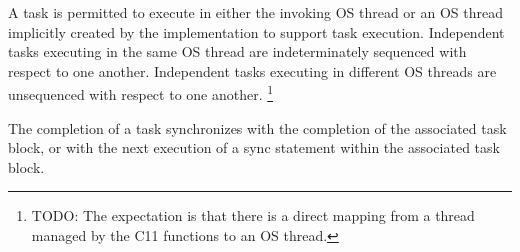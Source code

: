
\pnum
A task is permitted to execute
in either the invoking OS thread
or an OS thread implicitly created by the implementation
to support task execution.
Independent tasks executing in the same OS thread
are indeterminately sequenced with respect to one another.
Independent tasks executing in different OS threads
are unsequenced with respect to one another.
\footnote{TODO:
The expectation is that there is a direct mapping
from a thread managed by the C11
functions to an OS thread.
}

\pnum
{}
The completion of a task synchronizes
with the completion of the associated task block,
or with the next execution of a sync statement
within the associated task block.
